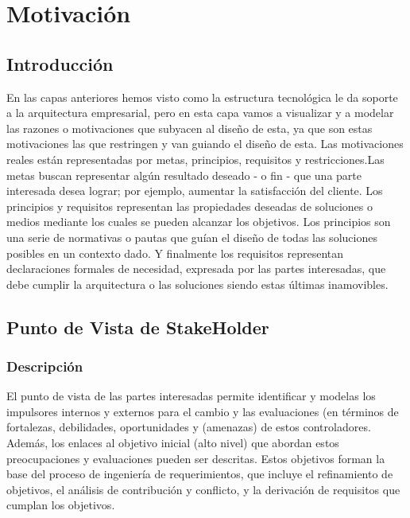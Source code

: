 \chapter{Motivación}


\section{Introducción}
En las capas anteriores hemos visto como la estructura tecnológica le da soporte a la arquitectura empresarial, pero en esta capa vamos a visualizar y a modelar las razones o motivaciones que subyacen al diseño de esta, ya que son estas motivaciones las que restringen y van guiando el diseño de esta.
Las motivaciones reales están representadas por metas, principios, requisitos y restricciones.Las metas buscan representar algún resultado deseado - o fin - que una parte interesada desea lograr; por ejemplo, aumentar la satisfacción del cliente. 
Los principios y requisitos representan las propiedades deseadas de soluciones  o medios  mediante los cuales se pueden alcanzar los objetivos. 
Los principios son una serie de normativas  o pautas que guían el diseño de todas las soluciones posibles en un contexto dado. Y finalmente los requisitos representan declaraciones formales de necesidad, expresada por las partes interesadas, que debe cumplir la arquitectura o las soluciones siendo estas últimas inamovibles.


\section{Punto de Vista de StakeHolder}
\subsection{Descripción}
El punto de vista de las partes interesadas permite identificar y modelas los impulsores internos y externos para el cambio y las evaluaciones (en términos de fortalezas, debilidades, oportunidades y (amenazas) de estos controladores. 
Además, los enlaces al objetivo inicial (alto nivel)  que abordan estos preocupaciones y evaluaciones pueden ser descritas. Estos objetivos forman la base del proceso de ingeniería de requerimientos, que incluye el refinamiento de objetivos, el análisis de contribución y conflicto, y la derivación de requisitos que cumplan los objetivos.


